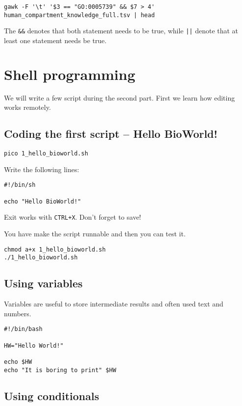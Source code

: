 \documentclass{article}\usepackage[]{graphicx}\usepackage[usenames,dvipsnames]{color}
\begin{document}
\begin{verbatim}
gawk -F '\t' '$3 == "GO:0005739" && $7 > 4' human_compartment_knowledge_full.tsv | head
\end{verbatim}

The \verb+&&+ denotes that both statement needs to be true, while \verb+||+ denote that at least one statement needs be true.

\section{Shell programming}

We will write a few script during the second part. First we learn how editing works remotely.

\subsection*{Coding the first script -- Hello BioWorld!}

\begin{verbatim}
pico 1_hello_bioworld.sh
\end{verbatim}

Write the following lines:

\begin{verbatim}
#!/bin/sh

echo "Hello BioWorld!"
\end{verbatim}

Exit works with \verb!CTRL+X!. Don't forget to save!

You have make the script runnable and then you can test it.

\begin{verbatim}
chmod a+x 1_hello_bioworld.sh
./1_hello_bioworld.sh
\end{verbatim}

\subsection*{Using variables}

Variables are useful to store intermediate results and often used text and numbers. 

\begin{verbatim}
#!/bin/bash

HW="Hello World!"

echo $HW
echo "It is boring to print" $HW
\end{verbatim}

\subsection*{Using conditionals}
\end{document}
